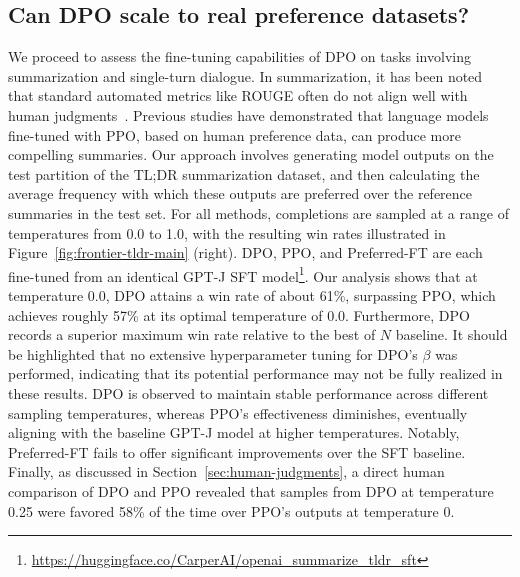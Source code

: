 \subsection{Can DPO scale to real preference datasets?}
\label{sec:dpo-real-datasets}
We proceed to assess the fine-tuning capabilities of DPO on tasks involving summarization and single-turn dialogue. In summarization, it has been noted that standard automated metrics like ROUGE often do not align well with human judgments~\citep{stiennon2022learning}. Previous studies have demonstrated that language models fine-tuned with PPO, based on human preference data, can produce more compelling summaries. Our approach involves generating model outputs on the test partition of the TL;DR summarization dataset, and then calculating the average frequency with which these outputs are preferred over the reference summaries in the test set. For all methods, completions are sampled at a range of temperatures from 0.0 to 1.0, with the resulting win rates illustrated in Figure~\ref{fig:frontier-tldr-main} (right). DPO, PPO, and Preferred-FT are each fine-tuned from an identical GPT-J SFT model\footnote{\url{https://huggingface.co/CarperAI/openai_summarize_tldr_sft}}. Our analysis shows that at temperature 0.0, DPO attains a win rate of about 61\%, surpassing PPO, which achieves roughly 57\% at its optimal temperature of 0.0. Furthermore, DPO records a superior maximum win rate relative to the best of $N$ baseline. It should be highlighted that no extensive hyperparameter tuning for DPO’s $\beta$ was performed, indicating that its potential performance may not be fully realized in these results. DPO is observed to maintain stable performance across different sampling temperatures, whereas PPO’s effectiveness diminishes, eventually aligning with the baseline GPT-J model at higher temperatures. Notably, Preferred-FT fails to offer significant improvements over the SFT baseline. Finally, as discussed in Section~\ref{sec:human-judgments}, a direct human comparison of DPO and PPO revealed that samples from DPO at temperature 0.25 were favored 58\% of the time over PPO’s outputs at temperature 0.

